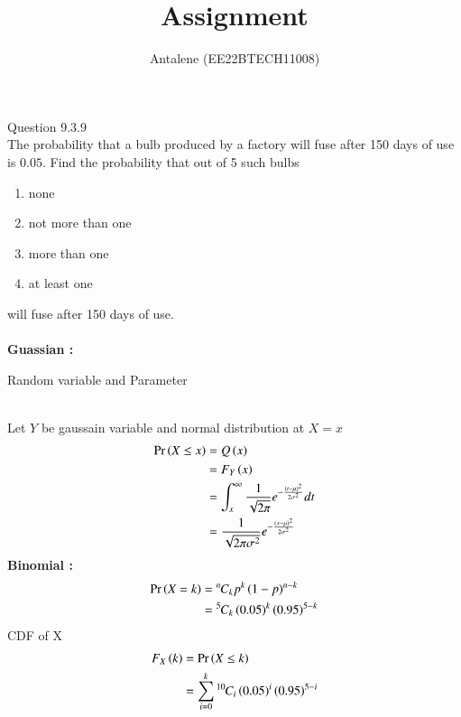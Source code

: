 \documentclass[article]{IEEEtran}
\theoremstyle{remark}
\begin{document}
\let\vec\mathbf


\title{
Assignment
}
\author{ Antalene (EE22BTECH11008)}
\maketitle

\vspace{3cm}
Question 9.3.9\\
The probability that a bulb produced by a factory will fuse after 150 days of use
is $0.05$. Find the probability that out of 5 such bulbs
\begin{enumerate}
\item  none
\item not more than one
\item more than one
\item at least one
\end{enumerate}
will fuse after 150 days of use.
\\
\solution\\
\textbf{Guassian :}\\
\begin{table}[h]
	\centering
	
	\caption{Random variable and Parameter}
        \label{tab:gauss/9/3/9}
\end{table}
\\Let $Y$ be gaussain variable and normal distribution at $X=x$
\begin{align}
	\Pr\left(X \leq x\right) &= Q\left(x\right)\\
	&= F_Y\left(x\right) \\
	&= \int_{x}^{\infty} \frac{1}{\sqrt{2\pi}}e^{-\frac{(t-\mu)^2}{2\sigma^2}} dt\\
	&= \frac{1}{\sqrt{2\pi\sigma^2}}e^{-\frac{(x-\mu)^2}{2\sigma^2}}
\end{align}
\textbf{Binomial :}
\begin{align}
	\Pr\left(X=k\right) &= {{}^{n}\mkern-1muC_{k}}p^k\left(1-p\right)^{n-k}\\
	&= {{}^{5}\mkern-1muC_{k}}\left(0.05\right)^k\left(0.95\right)^{5-k}
\end{align}
CDF of X
\begin{align}
	F_X\left(k\right) &= \Pr\left(X \leq k\right)\\
	&= \sum_{i=0}^{k}{{}^{10}\mkern-1muC_{i}}\left(0.05\right)^i\left(0.95\right)^{5-i}
\end{align}
\end{document}
